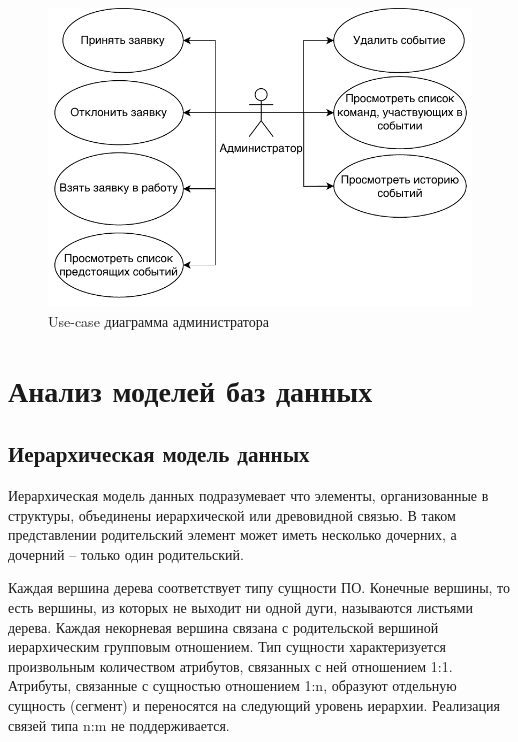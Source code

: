 \begin{figure}[H]
	\begin{center}
		\includegraphics[page=1,scale=1]{assets/use-case-admin.drawio.pdf}
	\end{center}
	\caption{Use-case диаграмма администратора}
	\label{use-case-admin}
\end{figure}


\section{Анализ моделей баз данных}

\subsection{Иерархическая модель данных}

Иерархическая модель данных подразумевает что элементы, организованные в структуры, объединены иерархической или древовидной связью. В таком представлении родительский элемент может иметь несколько дочерних, а дочерний -- только один родительский.

Каждая вершина дерева соответствует типу сущности ПО.  Конечные вершины, то есть вершины, из которых не выходит ни одной дуги, называются листьями дерева. Каждая некорневая вершина связана с родительской вершиной иерархическим групповым отношением. Тип сущности характеризуется произвольным количеством атрибутов, связанных с ней отношением 1:1. Атрибуты, связанные с сущностью отношением 1:n, образуют отдельную сущность (сегмент) и переносятся на следующий уровень иерархии. Реализация связей типа n:m не поддерживается.

